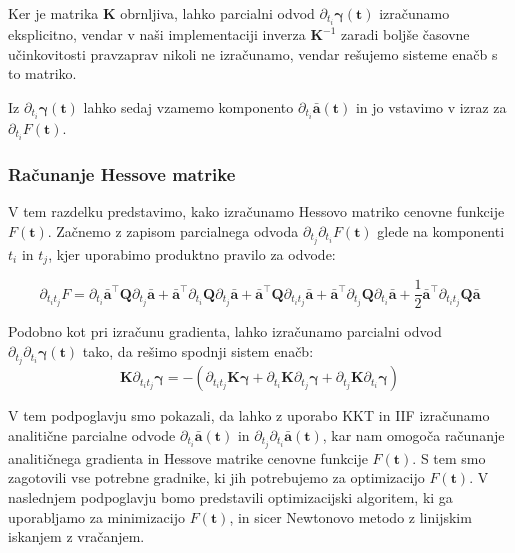 \documentclass[mat2, tisk]{fmfdelo}
\newcommand{\aimplicit}{\bar{\mathbf{a}}}
\newcommand{\yimplicit}{\mathbf{\gamma}}
\newcommand{\qmat}{\mathbf{Q}}
\newcommand{\kmat}{\mathbf{K}}
\newcommand{\tvec}{\mathbf{t}}
\begin{document}
Ker je matrika $\kmat$ obrnljiva, lahko parcialni odvod $\partial_{t_i} \yimplicit(\tvec)$ izračunamo eksplicitno, vendar v naši implementaciji inverza $\kmat^{-1}$ zaradi boljše časovne učinkovitosti pravzaprav nikoli ne izračunamo, vendar rešujemo sisteme enačb s to matriko.

Iz $\partial_{t_i} \yimplicit(\tvec)$ lahko sedaj vzamemo komponento $\partial_{t_i} \aimplicit(\tvec)$ in jo vstavimo v izraz za $\partial_{t_i} F(\tvec)$.

\subsubsection{Računanje Hessove matrike}
\label{sec:hess}

V tem razdelku predstavimo, kako izračunamo Hessovo matriko cenovne funkcije $F(\tvec)$. Začnemo z zapisom parcialnega odvoda $\partial_{t_j}\partial_{t_i} F(\tvec)$ glede na komponenti $t_i$ in $t_j$, kjer uporabimo produktno pravilo za odvode:

\begin{equation}
    \label{eq:hess}
    \partial_{t_it_j}F = 
    \partial_{t_i}\aimplicit^\top \qmat \partial_{t_j}\aimplicit 
    + \aimplicit^\top \partial_{t_i}\qmat \partial_{t_j}\aimplicit 
    + \aimplicit^\top \qmat \partial_{t_it_j}\aimplicit 
    + \aimplicit^\top \partial_{t_j}\qmat \partial_{t_i}\aimplicit 
    + \frac{1}{2}\aimplicit^\top \partial_{t_it_j}\qmat \aimplicit
\end{equation}

Podobno kot pri izračunu gradienta, lahko izračunamo parcialni odvod $\partial_{t_j}\partial_{t_i} \yimplicit(\tvec)$ tako, da rešimo spodnji sistem enačb:
\begin{equation}
    \mathbf{K} \partial_{t_it_j}\yimplicit = - (\partial_{t_it_j} \mathbf{K} \yimplicit
    + \partial_{t_i} \mathbf{K} \partial_{t_j}\yimplicit
    + \partial_{t_j} \mathbf{K} \partial_{t_i}\yimplicit)
\end{equation}

V tem podpoglavju smo pokazali, da lahko z uporabo \ac{KKT} in \acl{IIF} izračunamo analitične parcialne odvode $\partial_{t_i} \aimplicit(\tvec)$ in $\partial_{t_j}\partial_{t_i} \aimplicit(\tvec)$, kar nam omogoča računanje analitičnega gradienta in Hessove matrike cenovne funkcije $F(\tvec)$. S tem smo zagotovili vse potrebne gradnike, ki jih potrebujemo za optimizacijo $F(\tvec)$. V naslednjem podpoglavju bomo predstavili optimizacijski algoritem, ki ga uporabljamo za minimizacijo $F(\tvec)$, in sicer Newtonovo metodo z linijskim iskanjem z vračanjem.
\end{document}
